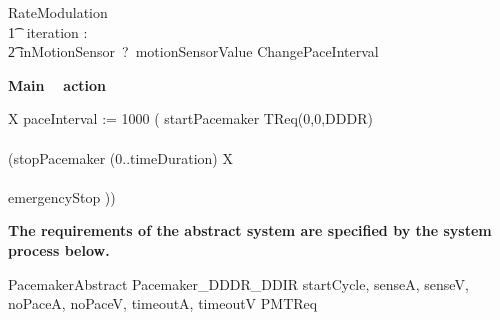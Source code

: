 \begin{circusaction}
RateModulation \circdef \\
\t1 \circvres\ iteration :\nat  \circspot \\
\t2 inMotionSensor~?~motionSensorValue \then ChangePaceInterval
\end{circusaction}



\textbf{ Main \Circus~ action }\\

\begin{circusaction}
	\circspot \circmu X \circspot paceInterval := 1000 \circseq ( startPacemaker \then TReq(0,0,DDDR) \\ 
   \circinterrupt \\
  (stopPacemaker \then \circwait(0..timeDuration) \circseq X \\ 
  \extchoice \\
  emergencyStop \then \Stop))
\end{circusaction}


\begin{circus}
  \circend
\end{circus}


\textbf{The requirements of the abstract system are specified by the system process below. }\\

\begin{circus}
\circprocess PacemakerAbstract \circdef  Pacemaker\_DDDR\_DDIR \lpar \lchanset startCycle, senseA, senseV, noPaceA, noPaceV, timeoutA, timeoutV \rchanset \rpar PMTReq
\end{circus}
